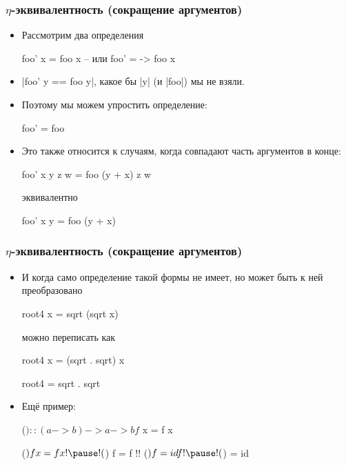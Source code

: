 \documentclass[10pt]{beamer}
\begin{document}
\begin{frame}[fragile]
  \frametitle{$\eta$-эквивалентность (сокращение аргументов)}
  \begin{itemize}
    \item Рассмотрим два определения
          \begin{haskell}
            foo' x = foo x
            -- или foo' = \x -> foo x 
          \end{haskell}
    \item \haskinline|foo' y == foo y|, какое бы \haskinline|y| (и \haskinline|foo|) мы не взяли.\pause
    \item Поэтому мы можем упростить определение:
          \begin{haskell}
            foo' = foo
          \end{haskell}
\pause
    \item Это также относится к случаям, когда совпадают часть аргументов в конце:
          \begin{haskell}
            foo' x y z w = foo (y + x) z w
          \end{haskell}
          эквивалентно
          \begin{haskell}
            foo' x y = foo (y + x)
          \end{haskell}
  \end{itemize}
\end{frame}

\begin{frame}[fragile]
  \frametitle{$\eta$-эквивалентность (сокращение аргументов)}
  \begin{itemize}
    \item И когда само определение такой формы не имеет, но может быть к ней преобразовано
          \begin{haskell}
            root4 x = sqrt (sqrt x)
          \end{haskell}
          можно переписать как
          \begin{haskell}
            root4 x = (sqrt . sqrt) x

            root4 = sqrt . sqrt
          \end{haskell}
    \item Ещё пример:
          \begin{haskell}
            ($) :: (a -> b) -> a -> b
            f $ x = f x

            ($) f x = f x !\pause!
            ($) f = f !\pause!
            ($) f = id f !\pause!
            ($) = id
          \end{haskell}
  \end{itemize}
\end{frame}
\end{document}
